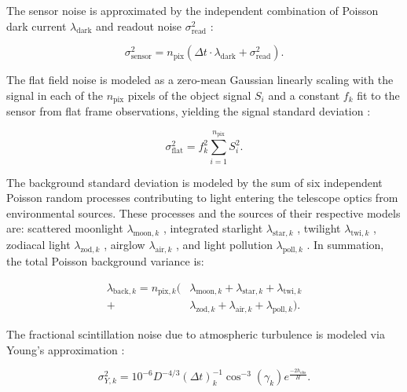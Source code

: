 \documentclass[a4paper,twocolumn]{spaceDebrisC} %
\begin{document}
The sensor noise is approximated by the independent combination of Poisson dark current $\lambda_\text{dark}$ and readout noise $\sigma_\text{read}^2$ \cite{krag2003}:

\begin{equation} \label{eq:sensor_noise}
  \sigma_\text{sensor}^2 = n_\text{pix} \left( \Delta t \cdot \lambda_\text{dark} + \sigma_\text{read}^2 \right).
\end{equation}

The flat field noise is modeled as a zero-mean Gaussian linearly scaling with the signal in each of the $n_\text{pix}$ pixels of the object signal $S_i$ and a constant $f_k$ fit to the sensor from flat frame observations, yielding the signal standard deviation \cite{newberry1996}: 

\begin{equation}
  \sigma_\text{flat}^2 = f_k^2 \sum_{i=1}^{n_\text{pix}} S_i^2.
\end{equation}

The background standard deviation is modeled by the sum of six independent Poisson random processes contributing to light entering the telescope optics from environmental sources. These processes and the sources of their respective models are: scattered moonlight $\lambda_{\text{moon},k}$ \cite{daniels1977}, integrated starlight $\lambda_{\text{star},k}$ \cite{krag2003}, twilight $\lambda_{\text{twi},k}$ \cite{patat2006}, zodiacal light $\lambda_{\text{zod},k}$ \cite{roach1972}, airglow $\lambda_{\text{air},k}$ \cite{krag2003}, and light pollution $\lambda_{\text{poll},k}$ \cite{falchi2016, falchi2016_data}. In summation, the total Poisson background variance is:

\begin{equation}
  \begin{split}
  \lambda_{\text{back},k} = n_{\text{pix},k} ( &\lambda_{\text{moon},k} + \lambda_{\text{star},k} + \lambda_{\text{twi},k} \\+ &\lambda_{\text{zod},k} + \lambda_{\text{air},k} + \lambda_{\text{poll},k} ).
  \end{split}
\end{equation}

The fractional scintillation noise due to atmospheric turbulence is modeled via Young's approximation \cite{osborn2015}:

\begin{equation} \label{eq:scint_noise}
  \sigma^2_{Y,k} = 10^{-6} D^{-4/3} (\Delta t)_k^{-1} \cos^{-3}\left(\gamma_k\right) e^{\frac{-2h_\text{obs}}{H}}.
\end{equation}
\end{document}
